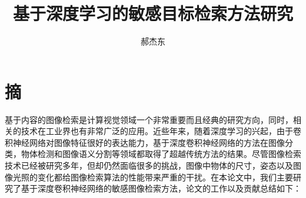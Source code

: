 

\confidential{} %
\title[基于深度学习的敏感目标检索方法研究]{基于深度学习的敏感目标检索方法研究}
\author{郝杰东} %
\advisorsec{} %


\maketitle
\makeenglishtitle

\makedeclaration

\chapter*{摘}
\setcounter{page}{1}%
基于内容的图像检索是计算视觉领域一个非常重要而且经典的研究方向，同时，相关的技术在工业界也有非常广泛的应用。近些年来，随着深度学习的兴起，由于卷积神经网络对图像特征很好的表达能力，基于深度卷积神经网络的方法在图像分类，物体检测和图像语义分割等领域都取得了超越传统方法的结果。尽管图像检索技术已经被研究多年，但却仍然面临很多的挑战，图像中物体的尺寸，姿态以及图像光照的变化都给图像检索算法的性能带来严重的干扰。在本论文中，我们主要研究了基于深度卷积神经网络的敏感图像检索方法，论文的工作以及贡献总结如下：

